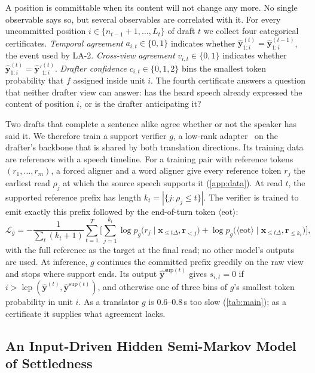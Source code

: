 A position is committable when its content will not change any more.
No single observable says so, but several observables are correlated with it.
For every uncommitted position $i \in \{n_{t-1}+1,\dots,L_t\}$ of draft $t$ we collect four categorical certificates.
\emph{Temporal agreement} $a_{i,t} \in \{0,1\}$ indicates whether $\hat{\bm{y}}^{(t)}_{1:i} = \hat{\bm{y}}^{(t-1)}_{1:i}$, the event used by LA-2.
\emph{Cross-view agreement} $v_{i,t} \in \{0,1\}$ indicates whether $\hat{\bm{y}}^{(t)}_{1:i} = \hat{\bm{y}}'^{(t)}_{1:i}$.
\emph{Drafter confidence} $c_{i,t} \in \{0,1,2\}$ bins the smallest token probability that $f$ assigned inside unit $i$.
The fourth certificate answers a question that neither drafter view can answer: has the heard speech already expressed the content of position $i$, or is the drafter anticipating it?

Two drafts that complete a sentence alike agree whether or not the speaker has said it.
We therefore train a support verifier $g$, a low-rank adapter~\citep{hu2022lora} on the drafter's backbone that is shared by both translation directions.
Its training data are references with a speech timeline.
For a training pair with reference tokens $(r_1,\dots,r_m)$, a forced aligner and a word aligner give every reference token $r_j$ the earliest read $\rho_j$ at which the source speech supports it (\cref{app:data}).
At read $t$, the supported reference prefix has length $k_t = |\{j : \rho_j \le t\}|$.
The verifier is trained to emit exactly this prefix followed by the end-of-turn token $\langle\mathrm{eot}\rangle$:
\begin{equation}
\mathcal{L}_{g} = -\frac{1}{\sum_t (k_t+1)} \sum_{t=1}^{T} \Big[\sum_{j=1}^{k_t} \log p_g\big(r_j \mid \bm{x}_{\le t\Delta}, \bm{r}_{<j}\big) + \log p_g\big(\langle\mathrm{eot}\rangle \mid \bm{x}_{\le t\Delta}, \bm{r}_{\le k_t}\big)\Big],
\label{eq:sap}
\end{equation}
with the full reference as the target at the final read; no other model's outputs are used.
At inference, $g$ continues the committed prefix greedily on the raw view and stops where support ends.
Its output $\hat{\bm{y}}^{\mathrm{sup}(t)}$ gives $s_{i,t} = 0$ if $i > \operatorname{lcp}(\hat{\bm{y}}^{(t)}, \hat{\bm{y}}^{\mathrm{sup}(t)})$, and otherwise one of three bins of $g$'s smallest token probability in unit $i$.
As a translator $g$ is $0.6$--$0.8$\,s too slow (\cref{tab:main}); as a certificate it supplies what agreement lacks.

\subsection{An Input-Driven Hidden Semi-Markov Model of Settledness}
\label{sec:hsmm}

